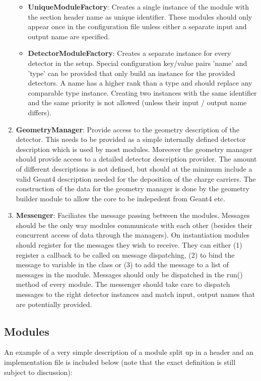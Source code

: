 \begin{enumerate}
\begin{itemize}
\item \textbf{UniqueModuleFactory}: Creates a single instance of the module with the section header name as unique identifier. These modules should only appear once in the configuration file unless either a separate input and output name are specified.
\item \textbf{DetectorModuleFactory}: Creates a separate instance for every detector in the setup. Special configuration key/value pairs 'name' and 'type' can be provided that only build an instance for the provided detectors. A name has a higher rank than a type and should replace any comparable type instance. Creating two instances with the same identifier and the same priority is not allowed (unless their input / output name differs).
\end{itemize}
\item \textbf{GeometryManager}: Provide access to the geometry description of the detector. This needs to be provided as a simple internally defined detector description which is used by most modules. Moreover the geometry manager should provide access to a detailed detector description provider. The amount of different descriptions is not defined, but should at the minimum include a valid Geant4 description needed for the deposition of the charge carriers. The construction of the data for the geometry manager is done by the geometry builder module to allow the core to be indepedent from Geant4 etc.
\item \textbf{Messenger}: Faciliates the message passing between the modules. Messages should be the only way modules communicate with each other (besides their concurrent access of data through the managers). On instantiation modules should register for the messages they wish to receive. They can either (1) register a callback to be called on message dispatching, (2) to bind the message to variable in the class or (3) to add the message to a list of messages in the module. Messages should only be dispatched in the run() method of every module. The messenger should take care to dispatch messages to the right detector instances and match input, output names that are potentially provided.
\end{enumerate}

\subsection{Modules}
An example of a very simple description of a module split up in a header and an implementation file is included below (note that the exact definition is still subject to discussion):


